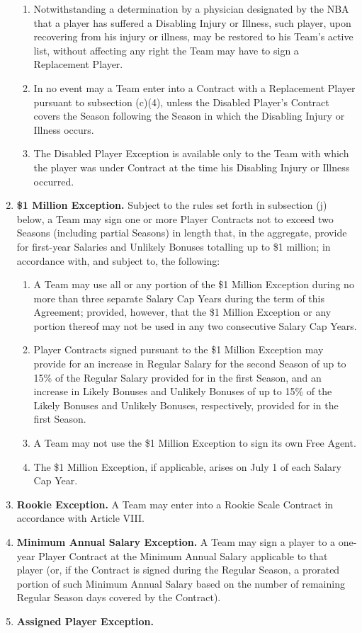 \documentclass[
]{book}
\providecommand{\tightlist}{%
  \setlength{\itemsep}{0pt}\setlength{\parskip}{0pt}}
\begin{document}
\begin{enumerate}
\begin{enumerate}
  \item
    Notwithstanding a determination by a physician designated by the NBA that a player has suffered a Disabling Injury or Illness, such player, upon recovering from his injury or illness, may be restored to his Team's active list, without affecting any right the Team may have to sign a Replacement Player.
  \item
    In no event may a Team enter into a Contract with a Replacement Player pursuant to subsection (c)(4), unless the Disabled Player's Contract covers the Season following the Season in which the Disabling Injury or Illness occurs.
  \item
    The Disabled Player Exception is available only to the Team with which the player was under Contract at the time his Disabling Injury or Illness occurred.
  \end{enumerate}
\item
  \textbf{\$1 Million Exception.} Subject to the rules set forth in subsection (j) below, a Team may sign one or more Player Contracts not to exceed two Seasons (including partial Seasons) in length that, in the aggregate, provide for first-year Salaries and Unlikely Bonuses totalling up to \$1 million; in accordance with, and subject to, the following:

  \begin{enumerate}
  \def\labelenumii{(\arabic{enumii})}
  \tightlist
  \item
    A Team may use all or any portion of the \$1 Million Exception during no more than three separate Salary Cap Years during the term of this Agreement; provided, however, that the \$1 Million Exception or any portion thereof may not be used in any two consecutive Salary Cap Years.
  \item
    Player Contracts signed pursuant to the \$1 Million Exception may provide for an increase in Regular Salary for the second Season of up to 15\% of the Regular Salary provided for in the first Season, and an increase in Likely Bonuses and Unlikely Bonuses of up to 15\% of the Likely Bonuses and Unlikely Bonuses, respectively, provided for in the first Season.
  \item
    A Team may not use the \$1 Million Exception to sign its own Free Agent.
  \item
    The \$1 Million Exception, if applicable, arises on July 1 of each Salary Cap Year.
  \end{enumerate}
\item
  \textbf{Rookie Exception.} A Team may enter into a Rookie Scale Contract in accordance with Article VIII.
\item
  \textbf{Minimum Annual Salary Exception.} A Team may sign a player to a one-year Player Contract at the Minimum Annual Salary applicable to that player (or, if the Contract is signed during the Regular Season, a prorated portion of such Minimum Annual Salary based on the number of remaining Regular Season days covered by the Contract).
\item
  \textbf{Assigned Player Exception.}


\end{enumerate}
\end{document}
